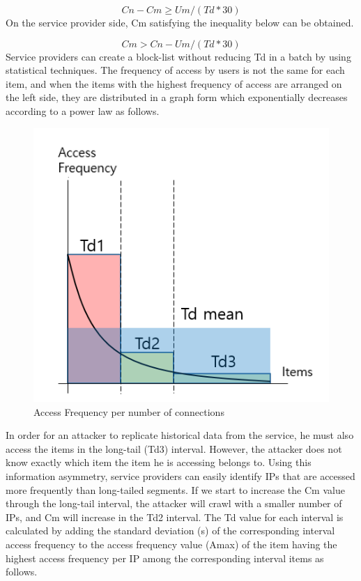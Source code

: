 \documentclass[sigconf,anonymous=false]{acmart}
\begin{document}
  \begin{displaymath}
Cn - Cm \geq Um / (Td * 30)
  \end{displaymath}\newline
On the service provider side, Cm satisfying the inequality below can be obtained.

  \begin{displaymath}
Cm > Cn - Um / (Td * 30)
  \end{displaymath}\newline
Service providers can create a block-list without reducing Td in a batch by using statistical techniques. The frequency of access by users is not the same for each item, and when the items with the highest frequency of access are arranged on the left side, they are distributed in a graph form which exponentially decreases according to a power law as follows.

\begin{figure}[H]
    \includegraphics[width=0.7\columnwidth]{figs/figure_01.png}
    \caption{Access Frequency per number of connections}
    \label{fig:my_label}
\end{figure}

In order for an attacker to replicate historical data from the service, he must also access the items in the long-tail (Td3) interval. However, the attacker does not know exactly which item the item he is accessing belongs to. Using this information asymmetry, service providers can easily identify IPs that are accessed more frequently than long-tailed segments. If we start to increase the Cm value through the long-tail interval, the attacker will crawl with a smaller number of IPs, and Cm will increase in the Td2 interval.
The Td value for each interval is calculated by adding the standard deviation (s) of the corresponding interval access frequency to the access frequency value (Amax) of the item having the highest access frequency per IP among the corresponding interval items as follows. 
\end{document}
